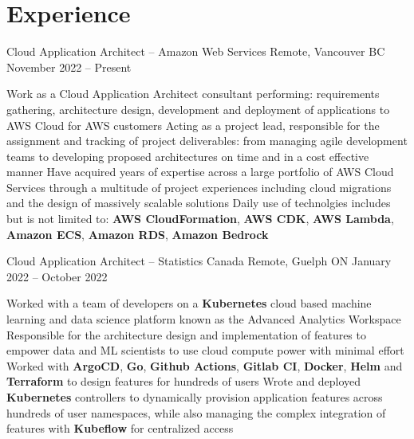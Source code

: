 \documentclass[a4paper,11pt]{article}
\begin{document}
\sectionsep
\section{Experience}
\begin{subheading}

	\resumeExp
	{Cloud Application Architect -- Amazon Web Services}
	{Remote, Vancouver BC}
	{November 2022 -- Present}
	{}
	\begin{entries}
        \ib Work as a Cloud Application Architect consultant performing: requirements gathering, architecture
        design, development and deployment of applications to AWS Cloud for AWS customers
        \ib Acting as a project lead, responsible for the assignment and tracking
        of project deliverables: from managing agile development teams to developing
        proposed architectures on time and in a cost effective manner
        \ib Have acquired years of expertise across a large portfolio of AWS Cloud Services
        through a multitude of project experiences including cloud migrations and the design
        of massively scalable solutions
        \ib Daily use of technolgies includes but is not limited to: \textbf{AWS CloudFormation}, 
        \textbf{AWS CDK}, \textbf{AWS Lambda}, \textbf{Amazon ECS}, \textbf{Amazon RDS}, \textbf{Amazon Bedrock}
    \end{entries}

	\resumeExp
	{Cloud Application Architect -- Statistics Canada}
	{Remote, Guelph ON}
	{January 2022 -- October 2022}
	{}
	\begin{entries}
		\ib Worked with a team of developers on a \textbf{Kubernetes} cloud based machine learning and data science
		platform known as the Advanced Analytics Workspace
		\href{https://analytics-platform.statcan.gc.ca/covid19}{\footnotesize{\faExternalLink}}
		\ib Responsible for the architecture design and implementation of features to  empower data and ML scientists to
		use cloud compute power with  minimal effort
		\ib Worked with \textbf{ArgoCD}, \textbf{Go}, \textbf{Github Actions}, \textbf{Gitlab CI}, \textbf{Docker}, \textbf{Helm} and
		\textbf{Terraform} to design features for hundreds of users
		\ib Wrote and deployed \textbf{Kubernetes} controllers to dynamically provision application
		features across hundreds of user namespaces, while
		also managing the complex integration of features with \textbf{Kubeflow} for centralized access
	\end{entries}


\end{subheading}
\end{document}
